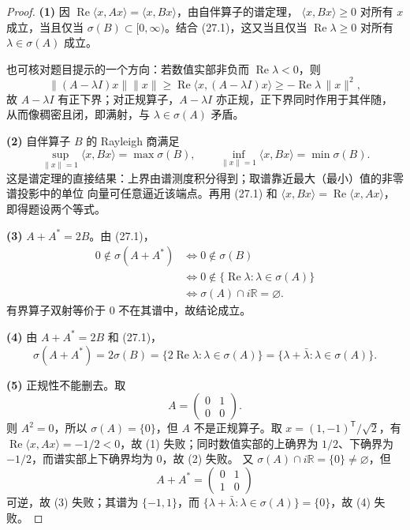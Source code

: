 \begin{proof}
\textbf{(1)} 因 $\operatorname{Re}\langle x,Ax\rangle=\langle x,Bx\rangle$，由自伴算子的谱定理，
$\langle x,Bx\rangle\geq0$ 对所有 $x$ 成立，当且仅当
$\sigma(B)\subset[0,\infty)$。结合 (27.1)，这又当且仅当
$\operatorname{Re}\lambda\geq0$ 对所有 $\lambda\in\sigma(A)$ 成立。

也可核对题目提示的一个方向：若数值实部非负而 $\operatorname{Re}\lambda<0$，则
\[
 \|(A-\lambda I)x\|\|x\|
 \geq\operatorname{Re}\langle x,(A-\lambda I)x\rangle
 \geq-\operatorname{Re}\lambda\,\|x\|^2,
\]
故 $A-\lambda I$ 有正下界；对正规算子，$A-\lambda I$ 亦正规，正下界同时作用于其伴随，
从而像稠密且闭，即满射，与 $\lambda\in\sigma(A)$ 矛盾。

\textbf{(2)} 自伴算子 $B$ 的 Rayleigh 商满足
\[
 \sup_{\|x\|=1}\langle x,Bx\rangle=\max\sigma(B),\qquad
 \inf_{\|x\|=1}\langle x,Bx\rangle=\min\sigma(B).
\]
这是谱定理的直接结果：上界由谱测度积分得到；取谱靠近最大（最小）值的非零谱投影中的单位
向量可任意逼近该端点。再用 (27.1) 和
$\langle x,Bx\rangle=\operatorname{Re}\langle x,Ax\rangle$，即得题设两个等式。

\textbf{(3)} $A+A^*=2B$。由 (27.1)，
\begin{align*}
 0\notin\sigma(A+A^*)
 &\iff0\notin\sigma(B)\\
 &\iff0\notin\{\operatorname{Re}\lambda:\lambda\in\sigma(A)\}\\
 &\iff\sigma(A)\cap i\mathbb R=\varnothing.
\end{align*}
有界算子双射等价于 $0$ 不在其谱中，故结论成立。

\textbf{(4)} 由 $A+A^*=2B$ 和 (27.1)，
\[
 \sigma(A+A^*)=2\sigma(B)
 =\{2\operatorname{Re}\lambda:\lambda\in\sigma(A)\}
 =\{\lambda+\bar\lambda:\lambda\in\sigma(A)\}.
\]

\textbf{(5)} 正规性不能删去。取
\[
 A=\begin{pmatrix}0&1\\0&0\end{pmatrix}.
\]
则 $A^2=0$，所以 $\sigma(A)=\{0\}$，但 $A$ 不是正规算子。取
$x=(1,-1)^{\mathsf T}/\sqrt2$，有
$\operatorname{Re}\langle x,Ax\rangle=-1/2<0$，故 (1) 失败；同时数值实部的上确界为
$1/2$、下确界为 $-1/2$，而谱实部上下确界均为 $0$，故 (2) 失败。
又 $\sigma(A)\cap i\mathbb R=\{0\}\neq\varnothing$，但
\[
 A+A^*=\begin{pmatrix}0&1\\1&0\end{pmatrix}
\]
可逆，故 (3) 失败；其谱为 $\{-1,1\}$，而
$\{\lambda+\bar\lambda:\lambda\in\sigma(A)\}=\{0\}$，故 (4) 失败。
\end{proof}
